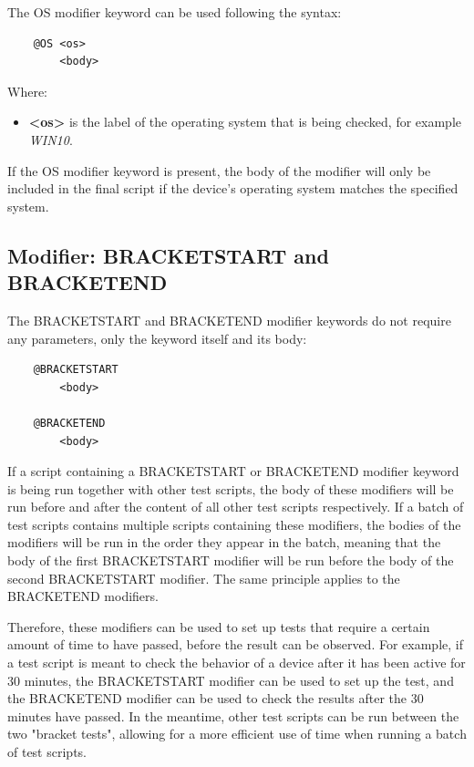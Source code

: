 The OS modifier keyword can be used following the syntax:

\begin{verbatim}
    @OS <os>
        <body>
\end{verbatim}

Where:
\begin{itemize}
    \item \textbf{<os>} is the label of the operating system that is being checked, for example \textit{WIN10}.
\end{itemize}

If the OS modifier keyword is present, the body of the modifier will only be included in the final script if the device's operating system matches the specified system. 

\subsection{Modifier: BRACKETSTART and BRACKETEND}

The BRACKETSTART and BRACKETEND modifier keywords do not require any parameters, only the keyword itself and its body:

\begin{verbatim}
    @BRACKETSTART
        <body>

    @BRACKETEND
        <body>
\end{verbatim}

If a script containing a BRACKETSTART or BRACKETEND modifier keyword is being run together with other test scripts, the body of these modifiers will be run before and after the content of all other test scripts respectively. If a batch of test scripts contains multiple scripts containing these modifiers, the bodies of the modifiers will be run in the order they appear in the batch, meaning that the body of the first BRACKETSTART modifier will be run before the body of the second BRACKETSTART modifier. The same principle applies to the BRACKETEND modifiers.

Therefore, these modifiers can be used to set up tests that require a certain amount of time to have passed, before the result can be observed. For example, if a test script is meant to check the behavior of a device after it has been active for 30 minutes, the BRACKETSTART modifier can be used to set up the test, and the BRACKETEND modifier can be used to check the results after the 30 minutes have passed. In the meantime, other test scripts can be run between the two "bracket tests", allowing for a more efficient use of time when running a batch of test scripts.

